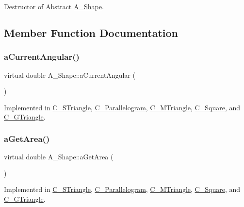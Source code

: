 Destructor of Abstract \hyperlink{classA__Shape}{A\+\_\+\+Shape}. 



\subsection{Member Function Documentation}
\mbox{\label{classA__Shape_a80fa4e009c875dd0ba7fc5bfeeb43f98}} 
\subsubsection{\texorpdfstring{a\+Current\+Angular()}{aCurrentAngular()}}
{\footnotesize\ttfamily virtual double A\+\_\+\+Shape\+::a\+Current\+Angular (\begin{DoxyParamCaption}{ }\end{DoxyParamCaption})\hspace{0.3cm}{\ttfamily [pure virtual]}}



Implemented in \hyperlink{classC__STriangle_a38304830925938339c4a4a0ad812e151}{C\+\_\+\+S\+Triangle}, \hyperlink{classC__Parallelogram_a51959da2b0cf083767f39d8065f395f2}{C\+\_\+\+Parallelogram}, \hyperlink{classC__MTriangle_aad1e42f1ec9c486736a403128ba47179}{C\+\_\+\+M\+Triangle}, \hyperlink{classC__Square_ac7779503b305fda4147b735622c66f81}{C\+\_\+\+Square}, and \hyperlink{classC__GTriangle_a98866648972bb78707c61aa7ebc22fb9}{C\+\_\+\+G\+Triangle}.

\mbox{\label{classA__Shape_a1b142ee2d873d6c217f65de1632e7b6e}} 
\subsubsection{\texorpdfstring{a\+Get\+Area()}{aGetArea()}}
{\footnotesize\ttfamily virtual double A\+\_\+\+Shape\+::a\+Get\+Area (\begin{DoxyParamCaption}{ }\end{DoxyParamCaption})\hspace{0.3cm}{\ttfamily [pure virtual]}}



Implemented in \hyperlink{classC__STriangle_aaff25f3c7f7640c3e7c735a77800e96e}{C\+\_\+\+S\+Triangle}, \hyperlink{classC__Parallelogram_a72b4509a33ee27331e5b9bdc8a3278e8}{C\+\_\+\+Parallelogram}, \hyperlink{classC__MTriangle_a1baff5085fc1b9822987e3fc307550ce}{C\+\_\+\+M\+Triangle}, \hyperlink{classC__Square_affd2be59872618d5d1955be360fb73e6}{C\+\_\+\+Square}, and \hyperlink{classC__GTriangle_a4d1c9a050aef86a7eab973b1fe668544}{C\+\_\+\+G\+Triangle}.

